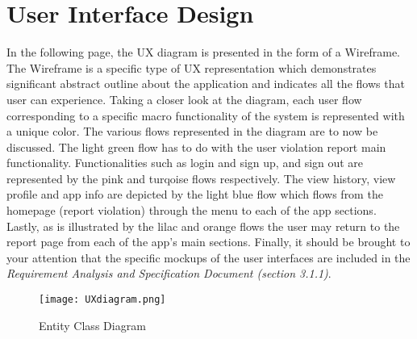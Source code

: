 \section{User Interface Design}
In the following page, the UX diagram is presented in the form of a Wireframe. The Wireframe is a specific type of UX representation which demonstrates significant abstract outline about the application and indicates all the flows that user can experience.  Taking a closer look at the diagram, each user flow corresponding to a specific macro functionality of the system is represented with a unique color. The various flows represented in the diagram are to now be discussed. The light green flow has to do with the user violation report main functionality. Functionalities such as login and sign up, and sign out are represented by the pink and turqoise flows respectively. The view history, view profile and app info are depicted by the light blue flow which flows from the homepage (report violation) through the menu to each of the app sections. Lastly, as is illustrated by the lilac and orange flows the user may return to the report page from each of the app's main sections. Finally, it should be brought to your attention that the specific mockups of the user interfaces are included in the \emph{Requirement Analysis and Specification Document (section 3.1.1)}.

\begin{sidewaysfigure}
\begin{figure}[H]
\caption{Entity Class Diagram}
\label{fig:Class}
\centering
\texttt{[image: UXdiagram.png]}
\end{figure}
\end{sidewaysfigure}

